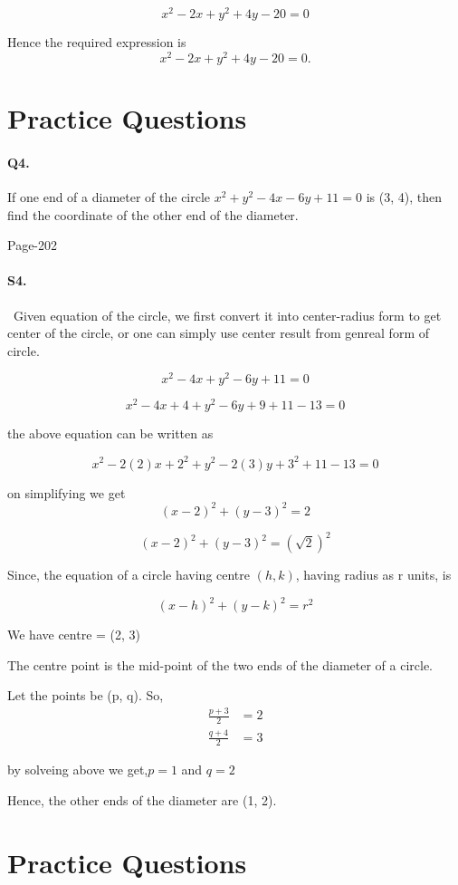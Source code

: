 \documentclass{article}
\begin{document}
$$x^2 - 2x + y^2 + 4y - 20 = 0$$

Hence the required expression is $$x^2 - 2x + y^2 + 4y - 20 = 0.$$

\clearpage
\section*{Practice Questions}
\paragraph{Q4.}If one end of a diameter of the circle $x^2 + y^2 - 4x - 6y + 11 = 0$ is (3, 4), then find
the coordinate of the other end of the diameter.
\begin{flushright}
    Page-202
\end{flushright}
\paragraph{S4.}\
Given equation of the circle, we first convert it into center-radius form to get center of the circle, or one can simply use center result from genreal form of circle.

$$x^2 - 4x + y^2 - 6y + 11 = 0$$

$$x^2 - 4x + 4 + y^2 - 6y + 9 +11 - 13 = 0$$

the above equation can be written as

$$x^2 - 2 (2) x + 2^2 + y^2 - 2 (3) y + 3^2 +11 - 13 = 0$$

on simplifying we get
$$(x - 2)^2 + (y - 3)^2 = 2$$

$$(x - 2)^2 + (y - 3)^2 = (\sqrt{2})^2$$

Since, the equation of a circle having centre $(h, k)$, having radius as r units, is

$$(x - h)^2 + (y - k)^2 = r^2$$

We have centre = (2, 3)

The centre point is the mid-point of the two ends of the diameter of a circle.

Let the points be (p, q). So,
\begin{align*}
    \frac{p+3}{2}&=2\\
    \frac{q+4}{2}&=3
\end{align*}

by solveing above we get,$p = 1$ and $q = 2$

Hence, the other ends of the diameter are (1, 2).
\clearpage
\section*{Practice Questions}
\end{document}
